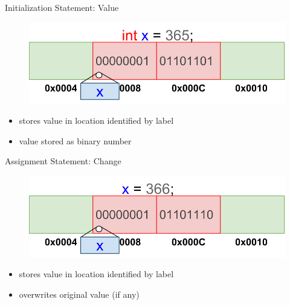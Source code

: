 \documentclass[xcolor={dvipsnames}]{beamer}
\begin{document}
\begin{frame}{Initialization Statement: Value}

\begin{figure}
	\includegraphics[width=1\textwidth]{init}
\end{figure}	

\begin{block}{}
	\begin{itemize}
		\item stores value in location identified by label
		\item value stored as binary number
	\end{itemize}
\end{block}
\end{frame}

\begin{frame}{Assignment Statement: Change}
\begin{figure}
	\includegraphics[width=1\textwidth]{change}
\end{figure}
\begin{block}{}
	\begin{itemize}
		\item stores value in location identified by label
		\item overwrites original value (if any)
	\end{itemize}
\end{block}
	
\end{frame}
\end{document}
